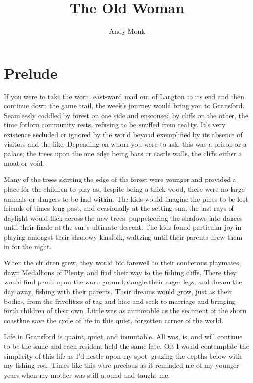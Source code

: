 \documentclass[11pt]{memoir}
\title{The Old Woman}
\author{Andy Monk}
\begin{document}
\clearpage\maketitle
\thispagestyle{empty}


\frontmatter

\chapter{Prelude}

    If you were to take the worn, east-ward road out of Langton to its end and then continue down the game trail, the week's journey would bring you to Gransford. Seamlessly coddled by forest on one side and ensconsed by cliffs on the other, the time forlorn community rests, refusing to be snuffed from reality. It's very existence secluded or ignored by the world beyond exemplified by its absence of visitors and the like. Depending on whom you were to ask, this was a prison or a palace; the trees upon the one edge being bars or castle walls, the cliffs either a moat or void.

    Many of the trees skirting the edge of the forest were younger and  provided a place for the children to play as, despite being a thick wood, there were no large animals or dangers to be had within. The kids would imagine the pines to be lost friends of times long past, and ocasionally at the setting sun, the last rays of daylight would flick across the new trees, puppeteering the shadows into dances until their finale at the sun's ultimate descent. The kids found particular joy in playing amongst their shadowy kinsfolk, waltzing until their parents drew them in for the night.

    When the children grew, they would bid farewell to their coniferous playmates, dawn Medallions of Plenty, and find their way to the fishing cliffs. There they would find perch upon the worn ground, dangle their eager legs, and dream the day away, fishing with their parents. Their dreams would grow, just as their bodies, from the frivolities of tag and hide-and-seek to marriage and bringing forth children of their own. Little was as unmovable as the sediment of the shorn coastline save the cycle of life in this quiet, forgotten corner of the world.

    Life in Gransford is quaint, quiet, and immutable. All was, is, and will continue to be the same and each resident held the same fate. Oft I would contemplate the simplicity of this life as I'd nestle upon my spot, grazing the depths below with my fishing rod. Times like this were precious as it reminded me of my younger years when my mother was still around and taught me.
\end{document}
